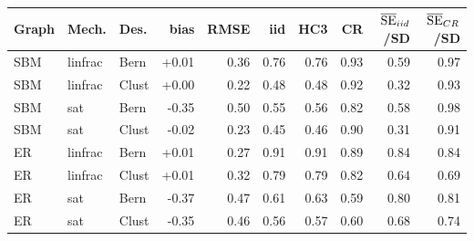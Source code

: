 \begin{tabular}{lllrrrrrrr}
\toprule
Graph & Mech. & Des. & bias & RMSE & iid & HC3 & CR & $\overline{\rm SE}_{iid}$/SD & $\overline{\rm SE}_{CR}$/SD \\
\midrule
SBM & linfrac & Bern & +0.01 & 0.36 & 0.76 & 0.76 & 0.93 & 0.59 & 0.97 \\
SBM & linfrac & Clust & +0.00 & 0.22 & 0.48 & 0.48 & 0.92 & 0.32 & 0.93 \\
SBM & sat & Bern & -0.35 & 0.50 & 0.55 & 0.56 & 0.82 & 0.58 & 0.98 \\
SBM & sat & Clust & -0.02 & 0.23 & 0.45 & 0.46 & 0.90 & 0.31 & 0.91 \\
ER & linfrac & Bern & +0.01 & 0.27 & 0.91 & 0.91 & 0.89 & 0.84 & 0.84 \\
ER & linfrac & Clust & +0.01 & 0.32 & 0.79 & 0.79 & 0.82 & 0.64 & 0.69 \\
ER & sat & Bern & -0.37 & 0.47 & 0.61 & 0.63 & 0.59 & 0.80 & 0.81 \\
ER & sat & Clust & -0.35 & 0.46 & 0.56 & 0.57 & 0.60 & 0.68 & 0.74 \\
\bottomrule
\end{tabular}
